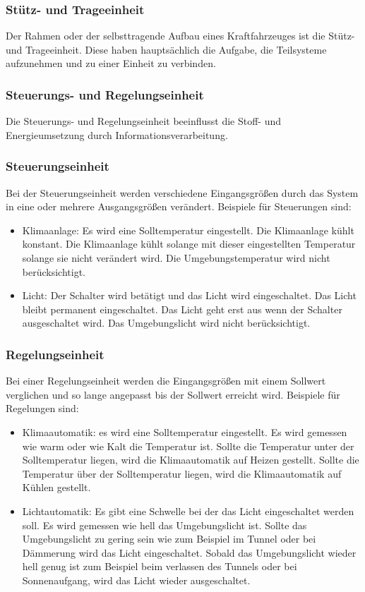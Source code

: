 \subsubsection{Stütz- und Trageeinheit}
Der Rahmen oder der selbsttragende Aufbau eines Kraftfahrzeuges ist die Stütz- und Trageeinheit.
Diese haben hauptsächlich die Aufgabe, die Teilsysteme aufzunehmen und zu einer Einheit zu verbinden.

\subsubsection{Steuerungs- und Regelungseinheit}
Die Steuerungs- und Regelungseinheit beeinflusst die Stoff- und Energieumsetzung durch Informationsverarbeitung.

\subsubsection{Steuerungseinheit}
Bei der Steuerungseinheit werden verschiedene Eingangsgrößen durch das System in eine oder mehrere Ausgangsgrößen verändert.
Beispiele für Steuerungen sind:
\begin{itemize}
	\item Klimaanlage: Es wird eine Solltemperatur eingestellt.
	      Die Klimaanlage kühlt konstant.
	      Die Klimaanlage kühlt solange mit dieser eingestellten Temperatur solange sie nicht verändert wird.
	      Die Umgebungstemperatur wird nicht berücksichtigt.
	\item Licht: Der Schalter wird betätigt und das Licht wird eingeschaltet.
	      Das Licht bleibt permanent eingeschaltet.
	      Das Licht geht erst aus wenn der Schalter ausgeschaltet wird.
	      Das Umgebungslicht wird nicht berücksichtigt.
\end{itemize}

\newpage

\subsubsection{Regelungseinheit}
Bei einer Regelungseinheit werden die Eingangsgrößen mit einem Sollwert verglichen und so lange angepasst bis der Sollwert erreicht wird.
Beispiele für Regelungen sind:
\begin{itemize}
	\item Klimaautomatik: es wird eine Solltemperatur eingestellt.
	      Es wird gemessen wie warm oder wie Kalt die Temperatur ist.
	      Sollte die Temperatur unter der Solltemperatur liegen, wird die Klimaautomatik auf Heizen gestellt.
	      Sollte die Temperatur über der Solltemperatur liegen, wird die Klimaautomatik auf Kühlen gestellt.
	\item Lichtautomatik: Es gibt eine Schwelle bei der das Licht eingeschaltet werden soll.
	      Es wird gemessen wie hell das Umgebungslicht ist.
	      Sollte das Umgebungslicht zu gering sein wie zum Beispiel im Tunnel oder bei Dämmerung wird das Licht eingeschaltet.
	      Sobald das Umgebungslicht wieder hell genug ist zum Beispiel beim verlassen des Tunnels oder bei Sonnenaufgang, wird das Licht wieder ausgeschaltet.
\end{itemize}
